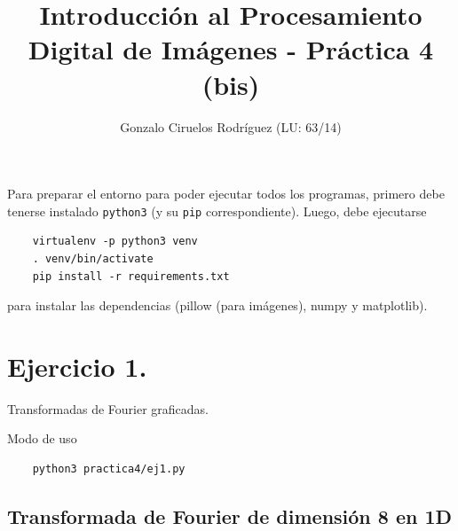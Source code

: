 \documentclass[11pt, spanish]{article}
\title{Introducción al Procesamiento Digital de Imágenes - Práctica 4 (bis)}
\date{}
\author{Gonzalo Ciruelos Rodríguez (LU: 63/14)}
\begin{document}
\maketitle

Para preparar el entorno para poder ejecutar todos los programas,
primero debe tenerse instalado \texttt{python3} (y su \texttt{pip} correspondiente).
Luego, debe ejecutarse 
\begin{verbatim}
    virtualenv -p python3 venv 
    . venv/bin/activate
    pip install -r requirements.txt 
\end{verbatim}

\noindent para instalar las dependencias (pillow (para imágenes), numpy y matplotlib).



\section{Ejercicio 1.}

Transformadas de Fourier graficadas.

Modo de uso
\begin{verbatim}
    python3 practica4/ej1.py
\end{verbatim}

\subsection{Transformada de Fourier de dimensión 8 en 1D}
\end{document}
